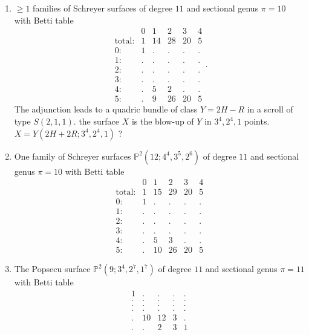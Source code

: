 \documentclass[twoside,12pt, leqno]{amsart}
\def\PP{{\mathbb P}}
\begin{document}
\begin{enumerate}
 \item $\ge 1$ families of Schreyer surfaces of  degree $11$ and sectional genus $\pi=10$ with Betti table
$$\begin{matrix}
       & 0 & 1 & 2 & 3 & 4\\
      \text{total:} & 1 & 14 & 28 & 20 & 5\\
      0: & 1 & . & . & . & .\\
      1: & . & . & . & . & .\\
      2: & . & . & . & . & .\\
      3: & . & . & . & . & .\\
      4: & . & 5 & 2 & . & .\\
      5: & . & 9 & 26 & 20 & 5
      \end{matrix}.$$
The adjunction leads to a quadric bundle of class $Y=2H-R$ in a scroll of type $S(2,1,1)$. the surface $X$ is the blow-up of $Y$ in $3^{4},2^{4},1$ points.
$X=Y(2H+2R;3^{4},2^{4},1)$ ?

 
  
  \item One family of Schreyer surfaces $\PP^{2}(12;4^{4},3^{5},2^{6})$ of  degree $11$ and sectional genus $\pi=10$ with Betti table
$$\begin{matrix}
        & 0 & 1 & 2 & 3 & 4\\
       \text{total:} & 1 & 15 & 29 & 20 & 5\\
       0: & 1 & . & . & . & .\\
       1: & . & . & . & . & .\\
       2: & . & . & . & . & .\\
       3: & . & . & . & . & .\\
       4: & . & 5 & 3 & . & .\\
       5: & . & 10 & 26 & 20 & 5
       \end{matrix}$$

      
\item   The Popsecu surface $\PP^{2}(9;3^{4},2^{7},1^{7})$ of degree $11$ and sectional genus $\pi=11$ with Betti table
$$\begin{matrix}
 1 & . & . & . & .\\
 . & . & . & . & .\\
 . & . & . & . & .\\
 . & . & . & . & .\\
 . & 10 & 12 & 3 & .\\
 . & . & 2 & 3 & 1
      \end{matrix}$$


\end{enumerate}
\end{document}
